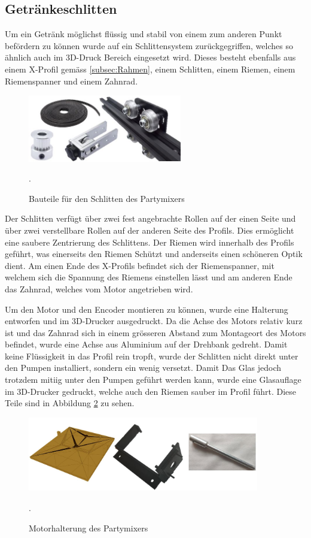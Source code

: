 \subsection{Getränkeschlitten}
\label{subsec:Getränkeschlitten}

Um ein Getränk möglichst flüssig und stabil von einem zum anderen Punkt befördern zu können wurde auf ein Schlittensystem zurückgegriffen, welches so ähnlich auch im 3D-Druck Bereich eingesetzt wird. Dieses besteht ebenfalls aus einem X-Profil gemäss \ref{subsec:Rahmen}, einem Schlitten, einem Riemen, einem Riemenspanner und einem Zahnrad. 

\begin{figure}[H]
	\centering
	\includegraphics[width=0.6\textwidth]{graphics/Schlitten}
	\caption{Bauteile für den Schlitten des Partymixers}.
	\label{fig:Schlitten}
\end{figure}

Der Schlitten verfügt über zwei fest angebrachte Rollen auf der einen Seite und über zwei verstellbare Rollen auf der anderen Seite des Profils. Dies ermöglicht eine saubere Zentrierung des Schlittens. Der Riemen wird innerhalb des Profils geführt, was einerseits den Riemen Schützt und anderseits einen schöneren Optik dient. Am einen Ende des X-Profils befindet sich der Riemenspanner, mit welchem sich die Spannung des Riemens einstellen lässt und am anderen Ende das Zahnrad, welches vom Motor angetrieben wird. 

Um den Motor und den Encoder montieren zu können, wurde eine Halterung entworfen und im 3D-Drucker ausgedruckt. Da die Achse des Motors relativ kurz ist und das Zahnrad sich in einem grösseren Abstand zum Montageort des Motors befindet, wurde eine Achse aus Aluminium auf der Drehbank gedreht.  Damit keine Flüssigkeit in das Profil rein tropft, wurde der Schlitten nicht direkt unter den Pumpen installiert, sondern ein wenig versetzt. Damit Das Glas jedoch trotzdem mitiig unter den Pumpen geführt werden kann, wurde eine Glasauflage im 3D-Drucker gedruckt, welche auch den Riemen sauber im Profil führt. Diese Teile sind in Abbildung \ref{fig:Motorhalterung} zu sehen.    

\begin{figure}[H]
	\centering
	\includegraphics[width=0.9\textwidth]{graphics/Motorhalterung}
	\caption{Motorhalterung des Partymixers}.
	\label{fig:Motorhalterung}
\end{figure}

